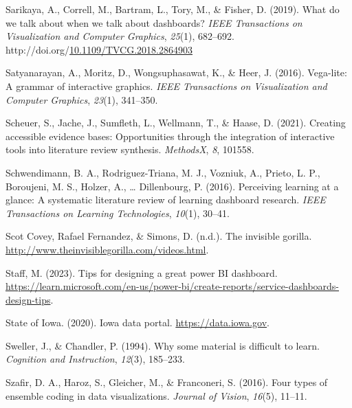 \documentclass[print]{nuthesis}
\newlength{\cslhangindent}
\newenvironment{CSLReferences}[2]%
{\setlength{\parindent}{0pt}%
\everypar{\setlength{\hangindent}{\cslhangindent}}\ignorespaces}%
{\par}
\begin{document}
\begin{CSLReferences}{1}{0}
\leavevmode{}%
Sarikaya, A., Correll, M., Bartram, L., Tory, M., \& Fisher, D. (2019). What do we talk about when we talk about dashboards? \emph{IEEE Transactions on Visualization and Computer Graphics}, \emph{25}(1), 682--692. http://doi.org/\href{https://doi.org/10.1109/TVCG.2018.2864903}{10.1109/TVCG.2018.2864903}

\leavevmode{}%
Satyanarayan, A., Moritz, D., Wongsuphasawat, K., \& Heer, J. (2016). Vega-lite: A grammar of interactive graphics. \emph{IEEE Transactions on Visualization and Computer Graphics}, \emph{23}(1), 341--350.

\leavevmode{}%
Scheuer, S., Jache, J., Sumfleth, L., Wellmann, T., \& Haase, D. (2021). Creating accessible evidence bases: Opportunities through the integration of interactive tools into literature review synthesis. \emph{MethodsX}, \emph{8}, 101558.

\leavevmode{}%
Schwendimann, B. A., Rodriguez-Triana, M. J., Vozniuk, A., Prieto, L. P., Boroujeni, M. S., Holzer, A., \ldots{} Dillenbourg, P. (2016). Perceiving learning at a glance: A systematic literature review of learning dashboard research. \emph{IEEE Transactions on Learning Technologies}, \emph{10}(1), 30--41.

\leavevmode{}%
Scot Covey, Rafael Fernandez, \& Simons, D. (n.d.). The invisible gorilla. \url{http://www.theinvisiblegorilla.com/videos.html}.

\leavevmode{}%
Staff, M. (2023). Tips for designing a great power BI dashboard. \url{https://learn.microsoft.com/en-us/power-bi/create-reports/service-dashboards-design-tips}.

\leavevmode{}%
State of Iowa. (2020). Iowa data portal. \url{https://data.iowa.gov}.

\leavevmode{}%
Sweller, J., \& Chandler, P. (1994). Why some material is difficult to learn. \emph{Cognition and Instruction}, \emph{12}(3), 185--233.

\leavevmode{}%
Szafir, D. A., Haroz, S., Gleicher, M., \& Franconeri, S. (2016). Four types of ensemble coding in data visualizations. \emph{Journal of Vision}, \emph{16}(5), 11--11.


\end{CSLReferences}
\end{document}
